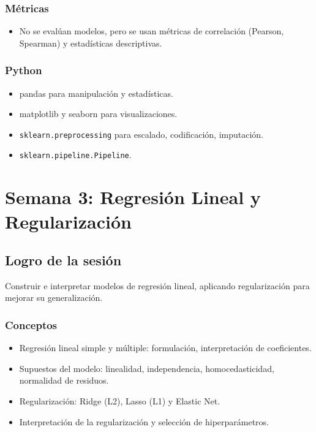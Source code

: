 \documentclass[12pt,a4paper,openany,oneside]{book}
\begin{document}
\subsection{Métricas}
\begin{itemize}
    \item No se evalúan modelos, pero se usan métricas de correlación (Pearson, Spearman) y estadísticas descriptivas.
\end{itemize}

\subsection{Python}
\begin{itemize}
    \item pandas para manipulación y estadísticas.
    \item matplotlib y seaborn para visualizaciones.
    \item \texttt{sklearn.preprocessing} para escalado, codificación, imputación.
    \item \texttt{sklearn.pipeline.Pipeline}.
\end{itemize}

\chapter{Semana 3: Regresión Lineal y Regularización}

\section{Logro de la sesión}
Construir e interpretar modelos de regresión lineal, aplicando regularización para mejorar su generalización.

\subsection{Conceptos}
\begin{itemize}
    \item Regresión lineal simple y múltiple: formulación, interpretación de coeficientes.
    \item Supuestos del modelo: linealidad, independencia, homocedasticidad, normalidad de residuos.
    \item Regularización: Ridge (L2), Lasso (L1) y Elastic Net.
    \item Interpretación de la regularización y selección de hiperparámetros.
\end{itemize}
\end{document}
